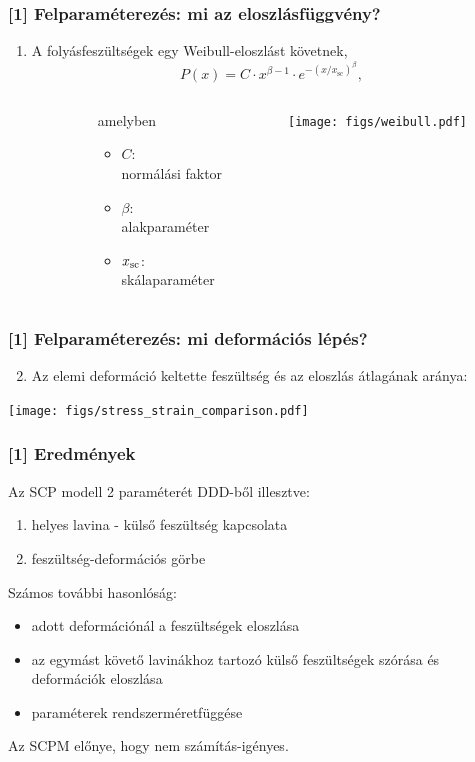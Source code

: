 \documentclass[12pt]{beamer}
\begin{document}
\begin{frame}
\frametitle{[1] Felparaméterezés: mi az eloszlásfüggvény?}
\begin{enumerate}
\item
A folyásfeszültségek egy Weibull-eloszlást követnek,
\[P\left( x \right) = C \cdot {x^{\beta  - 1}} \cdot {e^{ - {{\left( {x/{x_{{\text{sc}}}}} \right)}^\beta }}},\]
\begin{columns}
\begin{column}{0.15\textwidth} \end{column}
\begin{column}{0.31\textwidth}
amelyben
\begin{itemize}
\item $C$:\\normálási faktor
\item $\beta$:\\alakparaméter
\item $x_{\rm{sc}}$:\\skálaparaméter
\vspace{3em}
\end{itemize}
\end{column}
\begin{column}{0.6	\textwidth}
\centering
\texttt{[image: figs/weibull.pdf]}
\end{column}
\end{columns}
\end{enumerate}

\end{frame}



\begin{frame}
\frametitle{[1] Felparaméterezés: mi deformációs lépés?}
\begin{enumerate}
\setcounter{enumi}{1}
\item
Az elemi deformáció keltette feszültség és az eloszlás átlagának aránya:\\
\end{enumerate}

\centering
\texttt{[image: figs/stress\_strain\_comparison.pdf]}
\end{frame}


\begin{frame}
\frametitle{[1] Eredmények}
Az SCP modell 2 paraméterét DDD-ből illesztve:
\begin{enumerate}
\item helyes lavina - külső feszültség kapcsolata
\item feszültség-deformációs görbe
\end{enumerate}
Számos további hasonlóság:
\begin{itemize}
\item adott deformációnál a feszültségek eloszlása
\item az egymást követő lavinákhoz tartozó külső feszültségek szórása és deformációk eloszlása
\item paraméterek rendszerméretfüggése
\end{itemize}
Az SCPM előnye, hogy nem számítás-igényes.
\end{frame}
\end{document}
